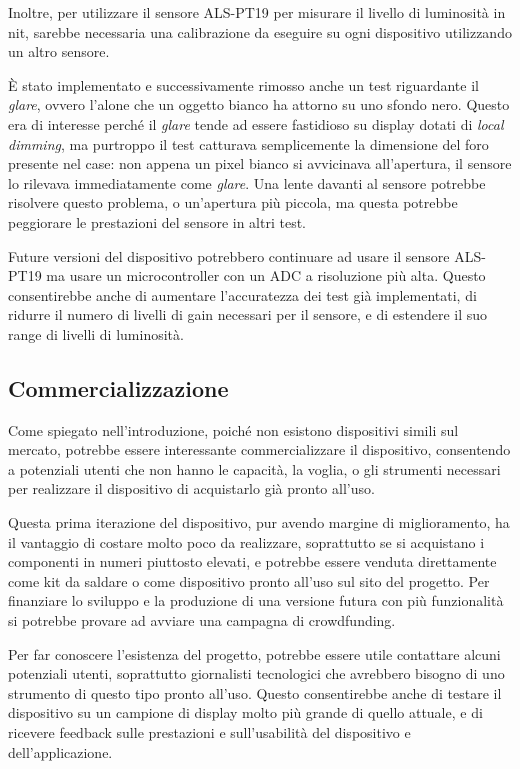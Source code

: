 Inoltre, per utilizzare il sensore ALS-PT19 per misurare il livello di luminosità in nit, sarebbe necessaria una calibrazione da eseguire su ogni dispositivo utilizzando un altro sensore.

È stato implementato e successivamente rimosso anche un test riguardante il \textit{glare}, ovvero l'alone che un oggetto bianco ha attorno su uno sfondo nero. Questo era di interesse perché il \textit{glare} tende ad essere fastidioso su display dotati di \textit{local dimming}, ma purtroppo il test catturava semplicemente la dimensione del foro presente nel case: non appena un pixel bianco si avvicinava all'apertura, il sensore lo rilevava immediatamente come \textit{glare}. Una lente davanti al sensore potrebbe risolvere questo problema, o un'apertura più piccola, ma questa potrebbe peggiorare le prestazioni del sensore in altri test.

Future versioni del dispositivo potrebbero continuare ad usare il sensore ALS-PT19 ma usare un microcontroller con un ADC a risoluzione più alta. Questo consentirebbe anche di aumentare l'accuratezza dei test già implementati, di ridurre il numero di livelli di gain necessari per il sensore, e di estendere il suo range di livelli di luminosità.

\subsection{Commercializzazione}
Come spiegato nell'introduzione, poiché non esistono dispositivi simili sul mercato, potrebbe essere interessante commercializzare il dispositivo, consentendo a potenziali utenti che non hanno le capacità, la voglia, o gli strumenti necessari per realizzare il dispositivo di acquistarlo già pronto all'uso.

Questa prima iterazione del dispositivo, pur avendo margine di miglioramento, ha il vantaggio di costare molto poco da realizzare, soprattutto se si acquistano i componenti in numeri piuttosto elevati, e potrebbe essere venduta direttamente come kit da saldare o come dispositivo pronto all'uso sul sito del progetto. Per finanziare lo sviluppo e la produzione di una versione futura con più funzionalità si potrebbe provare ad avviare una campagna di crowdfunding.

Per far conoscere l'esistenza del progetto, potrebbe essere utile contattare alcuni potenziali utenti, soprattutto giornalisti tecnologici che avrebbero bisogno di uno strumento di questo tipo pronto all'uso. Questo consentirebbe anche di testare il dispositivo su un campione di display molto più grande di quello attuale, e di ricevere feedback sulle prestazioni e sull'usabilità del dispositivo e dell'applicazione.

